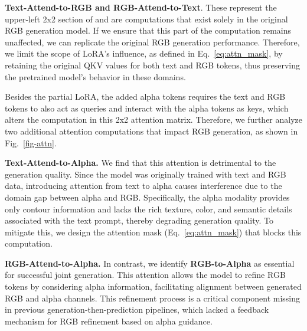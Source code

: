 \vspace{0.5em}
\noindent\textbf{Text-Attend-to-RGB and RGB-Attend-to-Text}. These represent the upper-left 2x2 section of  and are computations that exist solely in the original RGB generation model. If we ensure that this part of the computation remains unaffected, we can replicate the original RGB generation performance. Therefore, we limit the scope of LoRA's influence, as defined in Eq.~\eqref{eq:attn_mask}, by retaining the original QKV values for both text and RGB tokens, thus preserving the pretrained model’s behavior in these domains.

Besides the partial LoRA, the added alpha tokens requires the text and RGB tokens to also act as queries and interact with the alpha tokens as keys, which alters the computation in this 2x2 attention matrix. 
Therefore, we further analyze two additional attention computations that impact RGB generation, as shown in Fig.~\ref{fig-attn}.

\vspace{0.5em}
\noindent\textbf{Text-Attend-to-Alpha.} We find that this attention is detrimental to the generation quality. Since the model was originally trained with text and RGB data, introducing attention from text to alpha causes interference due to the domain gap between alpha and RGB. Specifically, the alpha modality provides only contour information and lacks the rich texture, color, and semantic details associated with the text prompt, thereby degrading generation quality. To mitigate this, we design the attention mask (Eq.~\eqref{eq:attn_mask}) that blocks this computation.

\vspace{0.5em}
\noindent\textbf{RGB-Attend-to-Alpha.} In contrast, we identify \textbf{RGB-to-Alpha} as essential for successful joint generation. This attention allows the model to refine RGB tokens by considering alpha information, facilitating alignment between generated RGB and alpha channels. This refinement process is a critical component missing in previous generation-then-prediction pipelines, which lacked a feedback mechanism for RGB refinement based on alpha guidance.



